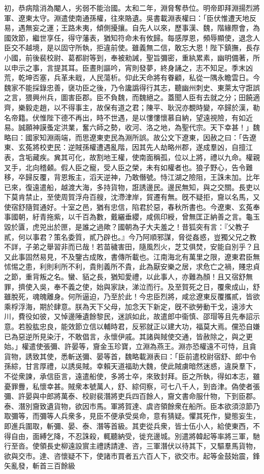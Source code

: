 \begin{pinyinscope}
初，恭病陰消為閹人，劣弱不能治國。太和二年，淵脅奪恭位。明帝即拜淵揚烈將軍、遼東太守。淵遣使南通孫權，往來賂遺。吳書載淵表權曰：「臣伏惟遭天地反易，遇無妄之運；王路未夷，傾側擾攘。自先人以來，歷事漢、魏，階緣際會，為國效節，繼世享任，得守藩表，猶知符命未有攸歸。每感厚恩，頻辱顯使，退念人臣交不越境，是以固守所執，拒違前使。雖義無二信，敢忘大恩！陛下鎮撫，長存小國，前後裴校尉、葛都尉等到，奉被勑誡，聖旨彌密，重紈累素，幽明備著，所以申示之事，言提其耳。臣晝則謳吟，宵則發夢，終身誦之，志不知足。季末凶荒，乾坤否塞，兵革未戢，人民蕩析。仰此天命將有眷顧，私從一隅永瞻雲日。今魏家不能採錄忠善，襃功臣之後，乃令讒譌得行其志，聽幽州刺史、東萊太守誑誤之言，猥興州兵，圖害臣郡。臣不負魏，而魏絕之。蓋聞人臣有去就之分；田饒適齊，樂毅走趙，以不得事主，故保有道之君；陳平、耿況亦覩時變，卒歸於漢，勒名帝籍。伏惟陛下德不再出，時不世遇，是以慺慺懷慕自納，望遠視險，有如近易。誠願神謨蚤定洪業，奮六師之勢，收河、洛之地，為聖代宗。天下幸甚！」魏略曰：國家知淵兩端，而思遼東吏民為淵所誤。故公文下遼東，因赦之曰：「告遼東、玄菟將校吏民：逆賊孫權遭遇亂階，因其先人劫略州郡，遂成羣凶，自擅江表，含垢藏疾。兾其可化，故割地王權，使南面稱孤，位以上將，禮以九命。權親叉手，北向稽顙。假人臣之寵，受人臣之榮，未有如權者也。狼子野心，告令難移，卒歸反覆，背恩叛主，滔天逆神，乃敢僭號。恃江湖之險阻，王誅未加。比年已來，復遠遣船，越渡大海，多持貨物，誑誘邊民。邊民無知，與之交關。長吏以下莫肯禁止，至使周賀浮舟百艘，沈滯津岸，貿遷有無。旣不疑拒，齎以名馬，又使宿舒隨賀通好。十室之邑，猶有忠信，陷君於惡，春秋所書也。今遼東、玄菟奉事國朝，紆青拖紫，以千百為數，戴纚垂纓，咸佩印綬，曾無匡正納善之言。龜玉毀於匵，虎兕出於匣，是誰之過歟？國朝為子大夫羞之！昔狐突有言：『父教子貳，何以事君？策名委質，貳乃辟也。』今乃阿順邪謀，脅從姦惑，豈獨父兄之教不詳，子弟之舉習非而已哉！若苗穢害田，隨風烈火，芝艾俱焚，安能自別乎？且又此事固然易見，不及鑒古成敗，書傳所載也。江南海北有萬里之限，遼東君臣無怵惕之患，利則利所不利，貴則義所不貴，此為厭安樂之居，求危亡之禍，賤忠貞之節，重背叛之名。蠻、貊之長，猶知愛禮，以此事人，亦難為顏！且又宿舒無罪，擠使入吳，奉不義之使，始與家訣，涕泣而行。及至賀死之日，覆衆成山，舒雖脫死，魂魄離身。何所逼迫，乃至於此！今忠臣烈將，咸忿遼東反覆攜貳，皆欲乘桴浮海，期於肆意。朕為天下父母，加念天下新定，旣不欲勞動干戈，遠涉大川，費役如彼，又悼邊陲遺餘黎民，迷誤如此，故遣郎中衞慎、邵瑁等且先奉詔示意。若股肱忠良，能效節立信以輔時君，反邪就正以建大功，福莫大焉。儻恐自嫌已為惡逆所見染汙，不敢倡言，永懷伊戚。其諸與賊使交通，皆赦除之，與之更始。」權遣使張彌、許晏等，齎金玉珍寶，立淵為燕王。淵亦恐權遠不可恃，且貪貨物，誘致其使，悉斬送彌、晏等首，魏略載淵表曰：「臣前遣校尉宿舒、郎中令孫綜，甘言厚禮，以誘吳賊。幸賴天道福助大魏，使此賊虜暗然迷惑，違戾羣下，不從衆諫，承信臣言，遠遣船使，多將士卒，來致封拜。臣之所執，得如本志，雖憂罪釁，私懷幸甚。賊衆本號萬人，舒、綜伺察，可七八千人，到沓津。偽使者張彌、許晏與中郎將萬泰、校尉裴潛將吏兵四百餘人，齎文書命服什物，下到臣郡。泰、潛別齎致遺貨物，欲因市馬。軍將賀達、虞咨領餘衆在船所。臣本欲須涼節乃取彌等，而彌等人兵衆多，見臣不便承受吳命，意有猜疑。懼其死作，變態妄生，即進兵圍取，斬彌、晏、泰、潛等首級。其吏從兵衆，皆士伍小人，給使東西，不得自由，面縛乞降，不忍誅殺，輒聽納受，徙充邊城。別遣將韓起等率將三軍，馳行至沓。使領長史柳遠設賔主禮誘請達、咨，三軍潛伏以待其下，又驅羣馬貨物，欲與交市。達、咨懷疑不下，使諸市買者五六百人下，欲交市。起等金鼓始震，鋒矢亂發，斬首三百餘級
\end{pinyinscope}
